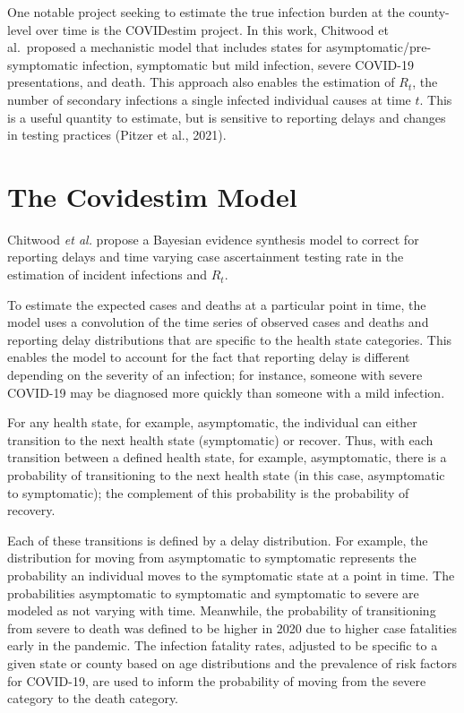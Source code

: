 \documentclass[12pt,twoside]{smiththesis}
\begin{document}
One notable project seeking to estimate the true infection burden at the county-level over time is the COVIDestim project. In this work, Chitwood et al.~proposed a mechanistic model that includes states for asymptomatic/pre-symptomatic infection, symptomatic but mild infection, severe COVID-19 presentations, and death. This approach also enables the estimation of \(R_t\), the number of secondary infections a single infected individual causes at time \(t\). This is a useful quantity to estimate, but is sensitive to reporting delays and changes in testing practices (Pitzer et al., 2021).

\hypertarget{the-covidestim-model}{%
\section{The Covidestim Model}\label{the-covidestim-model}}

Chitwood \emph{et al.} propose a Bayesian evidence synthesis model to correct for reporting delays and time varying case ascertainment testing rate in the estimation of incident infections and \(R_t\).

To estimate the expected cases and deaths at a particular point in time, the model uses a convolution of the time series of observed cases and deaths and reporting delay distributions that are specific to the health state categories. This enables the model to account for the fact that reporting delay is different depending on the severity of an infection; for instance, someone with severe COVID-19 may be diagnosed more quickly than someone with a mild infection.

For any health state, for example, asymptomatic, the individual can either transition to the next health state (symptomatic) or recover. Thus, with each transition between a defined health state, for example, asymptomatic, there is a probability of transitioning to the next health state (in this case, asymptomatic to symptomatic); the complement of this probability is the probability of recovery.

Each of these transitions is defined by a delay distribution. For example, the distribution for moving from asymptomatic to symptomatic represents the probability an individual moves to the symptomatic state at a point in time. The probabilities asymptomatic to symptomatic and symptomatic to severe are modeled as not varying with time. Meanwhile, the probability of transitioning from severe to death was defined to be higher in 2020 due to higher case fatalities early in the pandemic. The infection fatality rates, adjusted to be specific to a given state or county based on age distributions and the prevalence of risk factors for COVID-19, are used to inform the probability of moving from the severe category to the death category.
\end{document}

